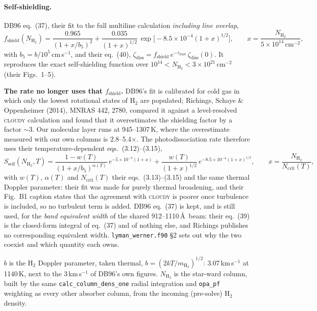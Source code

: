 \documentclass[english,a4paper]{my_memo}
\begin{document}
\paragraph{Self-shielding.} DB96 eq.~(37), their fit to the full multiline
calculation \emph{including line overlap},
\begin{equation}
  f_\mathrm{shield}(N_\mathrm{H_2}) = \frac{0.965}{(1+x/b_5)^{2}}
   + \frac{0.035}{(1+x)^{1/2}}\,\exp\!\big[-8.5\times10^{-4}(1+x)^{1/2}\big],
  \qquad x=\frac{N_\mathrm{H_2}}{5\times10^{14}\,\mathrm{cm^{-2}}},
\end{equation}
with $b_5=b/10^{5}$\,cm\,s$^{-1}$, and their eq.~(40),
$\zeta_\mathrm{diss}=f_\mathrm{shield}\,e^{-\tau_\mathrm{dust}}\,
\zeta_\mathrm{diss}(0)$. It reproduces the exact self-shielding function over
$10^{14}<N_\mathrm{H_2}<3\times10^{21}$\,cm$^{-2}$ (their Figs.~1--5).

\textbf{The rate no longer uses that $f_\mathrm{shield}$.} DB96's fit is
calibrated for cold gas in which only the lowest rotational states of H$_2$ are
populated; Richings, Schaye \& Oppenheimer (2014), MNRAS 442, 2780, compared it
against a level-resolved \textsc{cloudy} calculation and found that it
overestimates the shielding factor by a factor ${\sim}3$. Our molecular layer
runs at 945--1307\,K, where the overestimate measured with our own columns is
2.8--5.4$\times$. The photodissociation rate therefore uses their
temperature-dependent eqs.~(3.12)--(3.15),
\begin{equation}
  S_\mathrm{self}(N_\mathrm{H_2},T) =
    \frac{1-w(T)}{(1+x/b_5)^{\alpha(T)}}\,e^{-5\times10^{-7}(1+x)}
  + \frac{w(T)}{(1+x)^{1/2}}\,e^{-8.5\times10^{-4}(1+x)^{1/2}},
  \qquad x=\frac{N_\mathrm{H_2}}{N_\mathrm{crit}(T)},
\end{equation}
with $w(T)$, $\alpha(T)$ and $N_\mathrm{crit}(T)$ their eqs.~(3.13)--(3.15) and
the same thermal Doppler parameter: their fit was made for purely thermal
broadening, and their Fig.~B1 caption states that the agreement with
\textsc{cloudy} is poorer once turbulence is included, so no turbulent term is
added. DB96 eq.~(37) is kept, and is still used, for the \emph{band equivalent
width} of the shared 912--1110\,\AA\ beam: their eq.~(39) is the closed-form
integral of eq.~(37) and of nothing else, and Richings publishes no
corresponding equivalent width. \texttt{lyman\_werner.f90} \S2 sets out why the
two coexist and which quantity each owns.

$b$ is the H$_2$
Doppler parameter, taken thermal, $b=(2kT/m_\mathrm{H_2})^{1/2}$:
3.07\,km\,s$^{-1}$ at 1140\,K, next to the 3\,km\,s$^{-1}$ of DB96's own figures.
$N_\mathrm{H_2}$ is the star-ward column, built by the same
\texttt{calc\_column\_dens\_one} radial integration and \texttt{opa\_pf} weighting
as every other absorber column, from the incoming (pre-solve) H$_2$ density.
\end{document}
